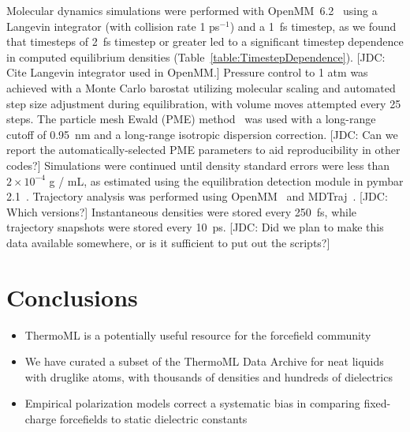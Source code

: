 \documentclass[aps,pre,twocolumn,nofootinbib,superscriptaddress,linenumbers]{revtex4-1}
\begin{document}
Molecular dynamics simulations were performed with OpenMM~6.2~\cite{eastman2012openmm} using a Langevin integrator (with collision rate 1 ps$^{-1}$) and a 1~fs timestep, as we found that timesteps of 2~fs timestep or greater led to a significant timestep dependence in computed equilibrium densities (Table~\ref{table:TimestepDependence}).  
{\color{red}[JDC: Cite Langevin integrator used in OpenMM.]}
Pressure control to 1 atm was achieved with a Monte Carlo barostat utilizing molecular scaling and automated step size adjustment during equilibration, with volume moves attempted every 25 steps.  
The particle mesh Ewald (PME) method~\cite{Darden1993} was used with a long-range cutoff of 0.95~nm and a long-range isotropic dispersion correction. 
{\color{red}[JDC: Can we report the automatically-selected PME parameters to aid reproducibility in other codes?]}
Simulations were continued until density standard errors were less than $2 \times 10^{-4}$ g / mL, as estimated using the equilibration detection module in pymbar 2.1~\cite{shirts2008statistically}.  
Trajectory analysis was performed using OpenMM~\cite{eastman2012openmm} and MDTraj~\cite{mcgibbon2014mdtraj}.  
{\color{red}[JDC: Which versions?]}
Instantaneous densities were stored every 250~fs, while trajectory snapshots were stored every 10~ps.  
{\color{red}[JDC: Did we plan to make this data available somewhere, or is it sufficient to put out the scripts?]}


\section{Conclusions}

\begin{itemize}
\item  ThermoML is a potentially useful resource for the forcefield community
\item  We have curated a subset of the ThermoML Data Archive for neat liquids with druglike atoms, with thousands of densities and hundreds of dielectrics
\item  Empirical polarization models correct a systematic bias in comparing fixed-charge forcefields to static dielectric constants
\end{itemize}

\end{document}
